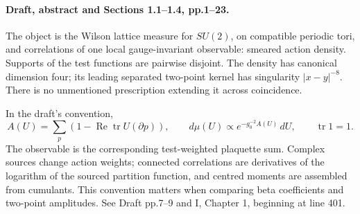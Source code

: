 \paragraph{Draft, abstract and Sections 1.1--1.4, pp.1--23.}
The object is the Wilson lattice measure for \(SU(2)\), on
compatible periodic tori, and correlations of one local
gauge-invariant observable: smeared action density.
Supports of the test functions are pairwise disjoint.
The density has canonical dimension four; its leading
separated two-point kernel has singularity \(|x-y|^{-8}\).
There is no unmentioned prescription extending it across
coincidence.

In the draft's convention,
\[
 A(U)=\sum_p(1-\operatorname{Re}\operatorname{tr}U(\partial p)),
 \qquad d\mu(U)\propto e^{-g_0^{-2}A(U)}\,dU,
 \qquad \operatorname{tr}1=1 .
\]
The observable is the corresponding test-weighted plaquette
sum. Complex sources change action weights; connected
correlations are derivatives of the logarithm of the
sourced partition function, and centred moments are
assembled from cumulants. This convention matters when
comparing beta coefficients and two-point amplitudes.
See Draft pp.7--9 and I, Chapter 1, beginning at line 401.

